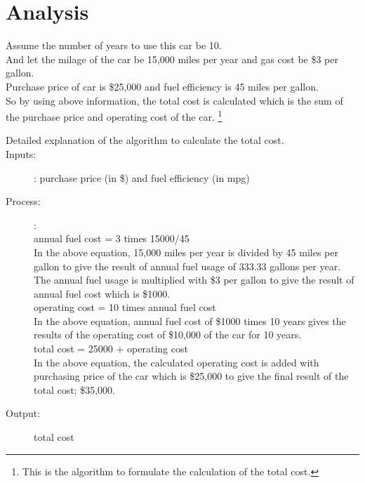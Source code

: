 \documentclass{article}
\begin{document}
\clearpage

\section*{Analysis}
Assume the number of years to use this car be 10. \\
And let the milage of the car be 15,000 miles per year and gas cost be \$3 per gallon. \\
Purchase price of car is \$25,000 and fuel efficiency is 45 miles per gallon. \\
So by using above information, the total cost is calculated which is the sum of the purchase price and operating cost of the car. 
\footnote{This is the algorithm to formulate the calculation of the total cost.}
 
\begin{description}
\item[\hypertarget{1}{Detailed explanation of the algorithm to calculate the total cost.}]
\item[Inputs:] : purchase price (in \$) and fuel efficiency (in mpg)
\item[Process:] :\\
annual fuel cost = 3 times 15000/45 \\
In the above equation, 15,000 miles per year is divided by 45 miles per gallon to give the result of annual fuel usage of 333.33 gallons per year. The annual fuel usage is multiplied with \$3 per gallon to give the result of annual fuel cost which is \$1000. \\
operating cost = 10 times annual fuel cost \\
In the above equation, annual fuel cost of \$1000 times 10 years gives the results of the operating cost of \$10,000 of the car for 10 years. \\
total cost = 25000 + operating cost \\
In the above equation, the calculated operating cost is added with purchasing price of the car which is \$25,000 to give the final result of the total cost; \$35,000. 
\item[Output:] total cost
\end{description}
\clearpage
\end{document}
